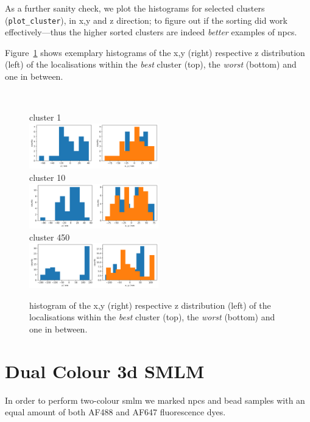 \documentclass[11pt, a4paper, oneside, twocolumn]{report}
\renewcommand{\tt}{\texttt}
\newcommand{\e}{\emph}
\newcommand{\x}[1]{#1\index{#1}}
\begin{document}
As a further sanity check, we plot the \x{histogram}s for selected
clusters (\tt{plot\_cluster}), in x,y and z direction; to figure out
if the sorting did work effectively---thus the higher sorted clusters
are indeed \e{better} examples of \gls{npc}s.

Figure~\ref{f:10_xyz_best_filtered_clusters} shows exemplary
histograms of the x,y (right) respective z distribution (left) of the
localisations within the \e{best} cluster (top), the \e{worst}
(bottom) and one in between.

\newpage
~ %
\begin{figure}[t!]
  \centering
  cluster 1\\
  \includegraphics[width=0.5\textwidth]{10_histograms_1.png}\\
  cluster 10\\
  \includegraphics[width=0.5\textwidth]{10_histograms_10.png}\\
  cluster 450\\
  \includegraphics[width=0.5\textwidth]{10_histograms_450.png}
  \caption{histogram of the x,y (right) respective z distribution
    (left) of the localisations within the \e{best} cluster (top), the
    \e{worst} (bottom) and one in between.}
  \label{f:10_xyz_best_filtered_clusters}
\end{figure}


\clearpage\section{Dual Colour 3d SMLM}\label{s:r:dcsim}

In order to perform two-colour \gls{smlm} we marked \gls{npc}s and
bead samples with an equal amount of both AF488 and AF647 fluorescence
dyes.
\end{document}
